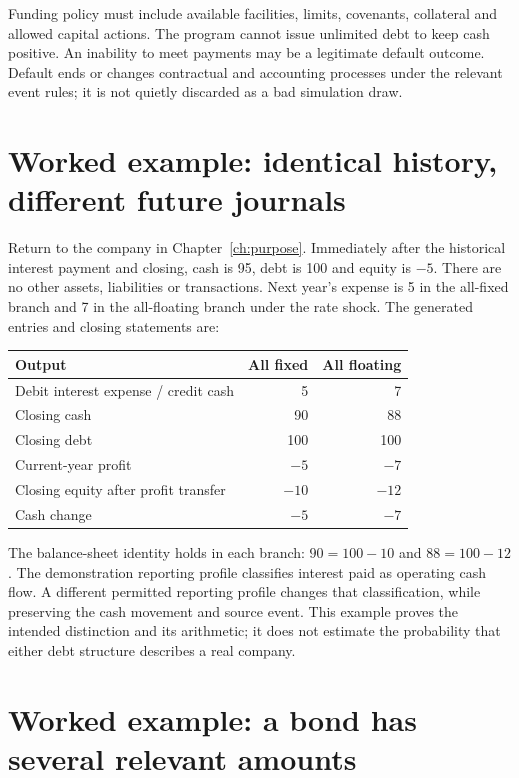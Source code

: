 Funding policy must include available facilities, limits, covenants, collateral
and allowed capital actions. The program cannot issue unlimited debt to keep
cash positive. An inability to meet payments may be a legitimate default
outcome. Default ends or changes contractual and accounting processes under
the relevant event rules; it is not quietly discarded as a bad simulation draw.

\section{Worked example: identical history, different future journals}

Return to the company in Chapter~\ref{ch:purpose}. Immediately after the
historical interest payment and closing, cash is 95, debt is 100 and equity
is $-5$. There are no other assets, liabilities or transactions. Next year's
expense is 5 in the all-fixed branch and 7 in the all-floating branch under
the rate shock. The generated entries and closing statements are:

\begin{center}
\begin{tabular}{lrr}
\toprule Output & All fixed & All floating\\\midrule
Debit interest expense / credit cash &5&7\\
Closing cash &90&88\\
Closing debt &100&100\\
Current-year profit & $-5$ & $-7$\\
Closing equity after profit transfer &$-10$&$-12$\\
Cash change &$-5$&$-7$\\\bottomrule
\end{tabular}
\end{center}
The balance-sheet identity holds in each branch: $90=100-10$ and
$88=100-12$. The demonstration reporting profile classifies interest paid as
operating cash flow. A different permitted reporting profile changes that
classification, while preserving the cash movement and source event. This
example proves the intended distinction and its arithmetic; it does not
estimate the probability that either debt structure describes a real company.

\section{Worked example: a bond has several relevant amounts}

